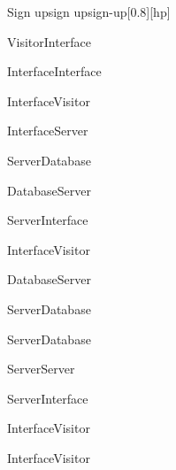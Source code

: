 \begin{toexclude}
\begin{sdfig}{Sign up}{sign up}{sign-up}[0.8][hp]
    \begin{umlcall}[op={Sign up}]{Visitor}{Interface}
      \begin{umlcall}[op={Validate}]{Interface}{Interface}
        \begin{umlfragment}[type=alt, label=valid]
          \begin{umlcall}[type=return,op={Loading}]{Interface}{Visitor}
            \begin{umlcall}[op={Sign up}]{Interface}{Server}
              \begin{umlcall}[op={Has user}]{Server}{Database}
                \begin{umlfragment}[type=alt, label=true]
                  \begin{umlcall}[type=return,op={Yes}]{Database}{Server}
                    \begin{umlcall}[type=return,op={Error}]{Server}{Interface}
                      \begin{umlcall}[type=return,op={Show error}]{Interface}{Visitor}
                      \end{umlcall}
                    \end{umlcall}
                  \end{umlcall}
                  \umlfpart[else]
                  \begin{umlcall}[type=return,op={No}]{Database}{Server}
                    \begin{umlcall}[op={Create user}]{Server}{Database}
                    \end{umlcall}
                    \begin{umlcall}[op={Create OTP}]{Server}{Database}
                      \begin{umlcall}[op={Send email}]{Server}{Server}
                        \begin{umlcall}[type=return,op={Ok}]{Server}{Interface}
                          \begin{umlcall}[type=return,op={Show success}]{Interface}{Visitor}
                          \end{umlcall}
                        \end{umlcall}
                      \end{umlcall}
                    \end{umlcall}
                  \end{umlcall}
                \end{umlfragment}
              \end{umlcall}
            \end{umlcall}
          \end{umlcall}
          \umlfpart[else]
          \begin{umlcall}[type=return,op={Show error}]{Interface}{Visitor}
          \end{umlcall}
        \end{umlfragment}
      \end{umlcall}
    \end{umlcall}
  \end{sdfig}


\end{toexclude}
